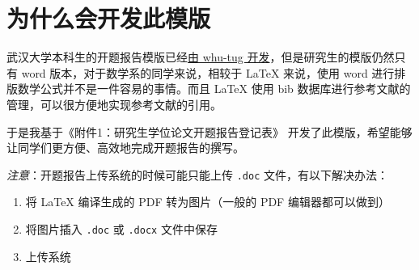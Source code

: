 
\section{为什么会开发此模版}

武汉大学本科生的开题报告模版已经\href{https://github.com/whutug/whu-thesis}{由 whu-tug 开发}，但是研究生的模版仍然只有 word 版本，对于数学系的同学来说，相较于 \LaTeX{} 来说，使用 word 进行排版数学公式并不是一件容易的事情。而且 \LaTeX{} 使用 bib 数据库进行参考文献的管理，可以很方便地实现参考文献的引用。

于是我基于《附件1：研究生学位论文开题报告登记表》\cite{研究生学位论文开题报告登记表} 开发了此模版，希望能够让同学们更方便、高效地完成开题报告的撰写。

\emph{注意}：开题报告上传系统的时候可能只能上传 \texttt{.doc} 文件，有以下解决办法：
\begin{enumerate}
  \item 将 \LaTeX{} 编译生成的 PDF 转为图片（一般的 PDF 编辑器都可以做到）
  \item 将图片插入 \texttt{.doc} 或 \texttt{.docx} 文件中保存
  \item 上传系统
\end{enumerate}